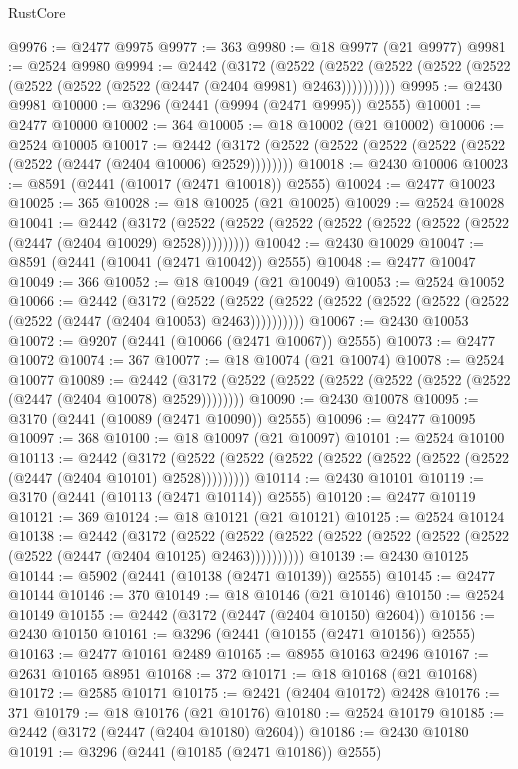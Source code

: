 \begin{lexlean}{RustCore}
\begin{coremodule}
@9976 := @2477 @9975
@9977 := 363
@9980 := @18 @9977 (@21 @9977)
@9981 := @2524 @9980
@9994 := @2442
    (@3172
      (@2522 (@2522 (@2522 (@2522 (@2522 (@2522 (@2522 (@2522 (@2447 (@2404 @9981) @2463))))))))))
@9995 := @2430 @9981
@10000 := @3296 (@2441 (@9994 (@2471 @9995)) @2555)
@10001 := @2477 @10000
@10002 := 364
@10005 := @18 @10002 (@21 @10002)
@10006 := @2524 @10005
@10017 := @2442 (@3172 (@2522 (@2522 (@2522 (@2522 (@2522 (@2522 (@2447 (@2404 @10006) @2529))))))))
@10018 := @2430 @10006
@10023 := @8591 (@2441 (@10017 (@2471 @10018)) @2555)
@10024 := @2477 @10023
@10025 := 365
@10028 := @18 @10025 (@21 @10025)
@10029 := @2524 @10028
@10041 := @2442
    (@3172 (@2522 (@2522 (@2522 (@2522 (@2522 (@2522 (@2522 (@2447 (@2404 @10029) @2528)))))))))
@10042 := @2430 @10029
@10047 := @8591 (@2441 (@10041 (@2471 @10042)) @2555)
@10048 := @2477 @10047
@10049 := 366
@10052 := @18 @10049 (@21 @10049)
@10053 := @2524 @10052
@10066 := @2442
    (@3172
      (@2522 (@2522 (@2522 (@2522 (@2522 (@2522 (@2522 (@2522 (@2447 (@2404 @10053) @2463))))))))))
@10067 := @2430 @10053
@10072 := @9207 (@2441 (@10066 (@2471 @10067)) @2555)
@10073 := @2477 @10072
@10074 := 367
@10077 := @18 @10074 (@21 @10074)
@10078 := @2524 @10077
@10089 := @2442 (@3172 (@2522 (@2522 (@2522 (@2522 (@2522 (@2522 (@2447 (@2404 @10078) @2529))))))))
@10090 := @2430 @10078
@10095 := @3170 (@2441 (@10089 (@2471 @10090)) @2555)
@10096 := @2477 @10095
@10097 := 368
@10100 := @18 @10097 (@21 @10097)
@10101 := @2524 @10100
@10113 := @2442
    (@3172 (@2522 (@2522 (@2522 (@2522 (@2522 (@2522 (@2522 (@2447 (@2404 @10101) @2528)))))))))
@10114 := @2430 @10101
@10119 := @3170 (@2441 (@10113 (@2471 @10114)) @2555)
@10120 := @2477 @10119
@10121 := 369
@10124 := @18 @10121 (@21 @10121)
@10125 := @2524 @10124
@10138 := @2442
    (@3172
      (@2522 (@2522 (@2522 (@2522 (@2522 (@2522 (@2522 (@2522 (@2447 (@2404 @10125) @2463))))))))))
@10139 := @2430 @10125
@10144 := @5902 (@2441 (@10138 (@2471 @10139)) @2555)
@10145 := @2477 @10144
@10146 := 370
@10149 := @18 @10146 (@21 @10146)
@10150 := @2524 @10149
@10155 := @2442 (@3172 (@2447 (@2404 @10150) @2604))
@10156 := @2430 @10150
@10161 := @3296 (@2441 (@10155 (@2471 @10156)) @2555)
@10163 := @2477 @10161 @2489
@10165 := @8955 @10163 @2496
@10167 := @2631 @10165 @8951
@10168 := 372
@10171 := @18 @10168 (@21 @10168)
@10172 := @2585 @10171
@10175 := @2421 (@2404 @10172) @2428
@10176 := 371
@10179 := @18 @10176 (@21 @10176)
@10180 := @2524 @10179
@10185 := @2442 (@3172 (@2447 (@2404 @10180) @2604))
@10186 := @2430 @10180
@10191 := @3296 (@2441 (@10185 (@2471 @10186)) @2555)

\end{coremodule}
\end{lexlean}
